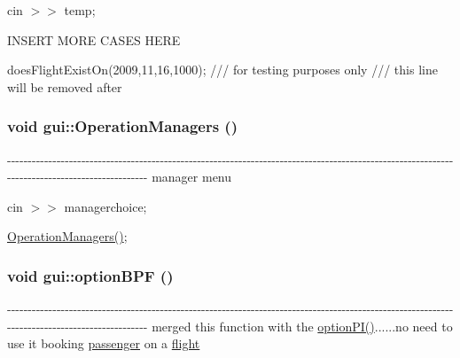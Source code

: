 cin $>$$>$ temp;

INSERT MORE CASES HERE

doesFlightExistOn(2009,11,16,1000); /// for testing purposes only /// this line will be removed after \hypertarget{classgui_afe37700bacd80503661c4f45b55019bd}{
\subsubsection[{OperationManagers}]{\setlength{\rightskip}{0pt plus 5cm}void gui::OperationManagers ()}}
\label{classgui_afe37700bacd80503661c4f45b55019bd}
-\/-\/-\/-\/-\/-\/-\/-\/-\/-\/-\/-\/-\/-\/-\/-\/-\/-\/-\/-\/-\/-\/-\/-\/-\/-\/-\/-\/-\/-\/-\/-\/-\/-\/-\/-\/-\/-\/-\/-\/-\/-\/-\/-\/-\/-\/-\/-\/-\/-\/-\/-\/-\/-\/-\/-\/-\/-\/-\/-\/-\/-\/-\/-\/-\/-\/-\/-\/-\/-\/-\/-\/-\/-\/-\/-\/-\/-\/-\/-\/-\/-\/-\/-\/-\/-\/-\/-\/-\/-\/-\/-\/-\/-\/-\/-\/-\/-\/-\/-\/-\/-\/-\/-\/-\/-\/-\/-\/-\/-\/-\/-\/-\/-\/-\/-\/-\/-\/-\/-\/-\/-\/-\/-\/-\/-\/-\/-\/-\/-\/-\/-\/-\/-\/-\/-\/-\/-\/-\/-\/-\/-\/ manager menu 

cin $>$$>$ managerchoice;

\hyperlink{classgui_afe37700bacd80503661c4f45b55019bd}{OperationManagers()}; \hypertarget{classgui_ac0563c10c6b42a47238cc7cc8445a989}{
\subsubsection[{optionBPF}]{\setlength{\rightskip}{0pt plus 5cm}void gui::optionBPF ()}}
\label{classgui_ac0563c10c6b42a47238cc7cc8445a989}
-\/-\/-\/-\/-\/-\/-\/-\/-\/-\/-\/-\/-\/-\/-\/-\/-\/-\/-\/-\/-\/-\/-\/-\/-\/-\/-\/-\/-\/-\/-\/-\/-\/-\/-\/-\/-\/-\/-\/-\/-\/-\/-\/-\/-\/-\/-\/-\/-\/-\/-\/-\/-\/-\/-\/-\/-\/-\/-\/-\/-\/-\/-\/-\/-\/-\/-\/-\/-\/-\/-\/-\/-\/-\/-\/-\/-\/-\/-\/-\/-\/-\/-\/-\/-\/-\/-\/-\/-\/-\/-\/-\/-\/-\/-\/-\/-\/-\/-\/-\/-\/-\/-\/-\/-\/-\/-\/-\/-\/-\/-\/-\/-\/-\/-\/-\/-\/-\/-\/-\/-\/-\/-\/-\/-\/-\/-\/-\/-\/-\/-\/-\/-\/-\/-\/-\/-\/-\/-\/-\/-\/-\/ merged this function with the \hyperlink{classgui_a1da09a34a60debec7214d3f2d9691c73}{optionPI()}......no need to use it booking \hyperlink{classpassenger}{passenger} on a \hyperlink{classflight}{flight} 

